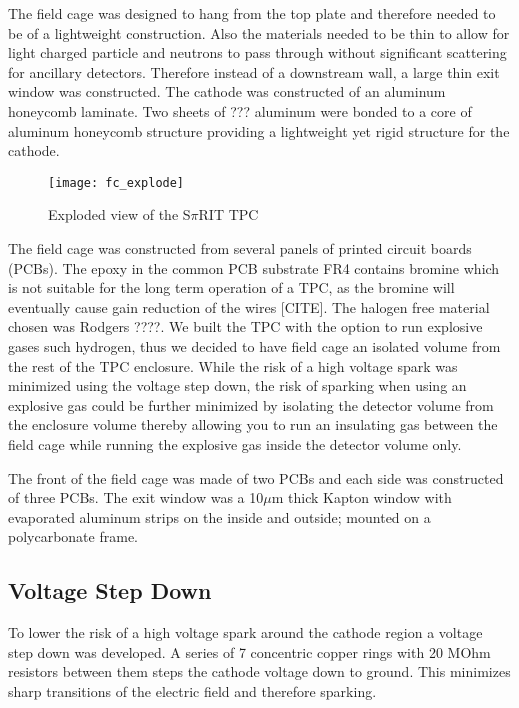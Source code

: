 The field cage was designed to hang from the top plate and therefore needed to be of a lightweight construction. Also the materials needed to be thin to allow for light charged particle and neutrons to pass through without significant scattering for ancillary detectors. Therefore instead of a downstream wall, a large thin exit window was constructed. The cathode was constructed of an aluminum honeycomb laminate. Two sheets of ??? aluminum were bonded to a core of aluminum honeycomb structure providing a lightweight yet rigid structure for the cathode. 

\begin{figure}[H]
\texttt{[image: fc\_explode]}
\caption{Exploded view of the S$\pi$RIT TPC}
\label{fig:fc_explode}
\end{figure}

The field cage was constructed from several panels of printed circuit boards (PCBs). The epoxy in the common PCB substrate FR4 contains bromine which is not suitable for the long term operation of a TPC, as the bromine will eventually cause gain reduction of the wires [CITE]. The halogen free material chosen was Rodgers ????. We built the TPC with the option to run explosive gases such  hydrogen, thus we decided to have field cage an isolated volume from the rest of the TPC enclosure. While the risk of a high voltage spark was minimized using the voltage step down, the risk of sparking when using an explosive gas could be further minimized by isolating the detector volume from the enclosure volume thereby allowing you to run an insulating gas between the field cage while running the explosive gas inside the detector volume only.  

The front of the field cage was made of two PCBs and each side was constructed of three PCBs. The exit window was a 10$\mu$m thick Kapton window with evaporated aluminum strips on the inside and outside; mounted on a polycarbonate frame.

\subsection{Voltage Step Down}

To lower the risk of a high voltage spark around the cathode region a voltage step down was developed. A series of 7 concentric copper rings with 20 MOhm resistors between them steps the cathode voltage down to ground. This minimizes sharp transitions of the electric field and therefore sparking. 

